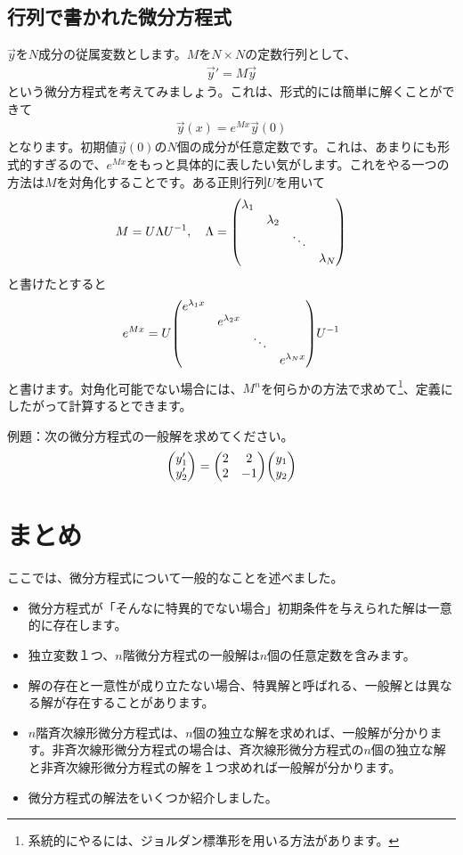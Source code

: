 \documentclass[report,paper=a4, fontsize=12pt, line_length=16cm, number_of_lines=33,dvipdfmx]{jlreq}
\numberwithin{equation}{section}
\newcommand{\yv}{\vec{y}}
\begin{document}
\subsection{行列で書かれた微分方程式}
$\yv$を$N$成分の従属変数とします。$M$を$N\times N$の定数行列として、
\begin{align}
  \yv'=M\yv
\end{align}
という微分方程式を考えてみましょう。これは、形式的には簡単に解くことができて
\begin{align}
  \yv(x)=e^{Mx}\yv(0)
\end{align}
となります。初期値$\yv(0)$の$N$個の成分が任意定数です。これは、あまりにも形式的すぎるので、$e^{Mx}$をもっと具体的に表したい気がします。これをやる一つの方法は$M$を対角化することです。ある正則行列$U$を用いて
\begin{align}
  M=U\Lambda U^{-1},\quad 
  \Lambda=\mqty(\dmat{\lambda_1,\lambda_2,\ddots,\lambda_N})
\end{align}
と書けたとすると
\begin{align}
  e^{Mx}=U\mqty(\dmat{e^{\lambda_1x},e^{\lambda_2x},\ddots,e^{\lambda_Nx}})U^{-1}
\end{align}
と書けます。対角化可能でない場合には、$M^n$を何らかの方法で求めて\footnote{系統的にやるには、ジョルダン標準形を用いる方法があります。}、定義にしたがって計算するとできます。

例題：次の微分方程式の一般解を求めてください。
\begin{align}
  \mqty(y_1'\\ y_2')=\mqty(
    2 & 2 \\
    2 & -1
  )
    \mqty(y_1\\y_2)    
\end{align}

\section{まとめ}
ここでは、微分方程式について一般的なことを述べました。
\begin{itemize}
  \item 微分方程式が「そんなに特異的でない場合」初期条件を与えられた解は一意的に存在します。
  \item 独立変数１つ、$n$階微分方程式の一般解は$n$個の任意定数を含みます。
  \item 解の存在と一意性が成り立たない場合、特異解と呼ばれる、一般解とは異なる解が存在することがあります。
  \item $n$階斉次線形微分方程式は、$n$個の独立な解を求めれば、一般解が分かります。非斉次線形微分方程式の場合は、斉次線形微分方程式の$n$個の独立な解と非斉次線形微分方程式の解を１つ求めれば一般解が分かります。
  \item 微分方程式の解法をいくつか紹介しました。
\end{itemize}
\end{document}
